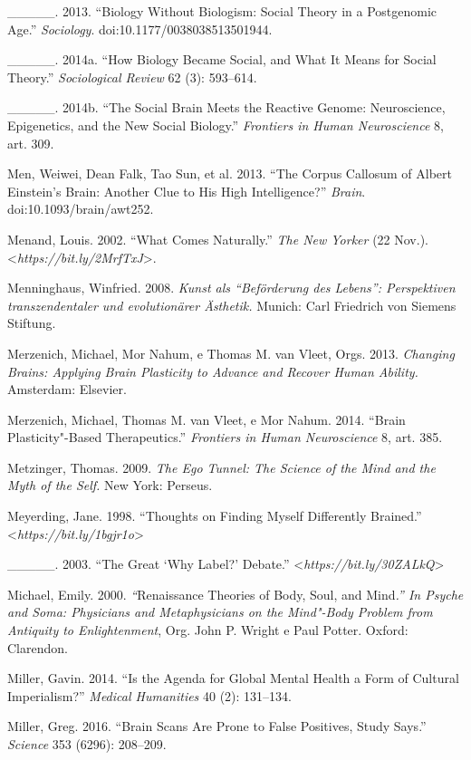 {\begin{Parskip}
\_\_\_\_\_. 2013. ``Biology Without Biologism: Social Theory in a
Postgenomic Age.'' \emph{Sociology}. doi:10.1177/0038038513501944.

\_\_\_\_\_. 2014a. ``How Biology Became Social, and What It Means for
Social Theory.'' \emph{Sociological Review} 62 (3): 593--614.

\_\_\_\_\_. 2014b. ``The Social Brain Meets the Reactive Genome:
Neuroscience, Epigenetics, and the New Social Biology.'' \emph{Frontiers
in Human Neuroscience} 8, art. 309.

Men, Weiwei, Dean Falk, Tao Sun, et al. 2013. ``The Corpus Callosum of
Albert Einstein's Brain: Another Clue to His High Intelligence?''
\emph{Brain}. doi:10.1093/brain/awt252.

Menand, Louis. 2002. ``What Comes Naturally.'' \emph{The New Yorker} (22
Nov.).
\textless{}\emph{https://bit.ly/2MrfTxJ}\textgreater{}.

Menninghaus, Winfried. 2008. \emph{Kunst als ``Beförderung des Lebens'':
Perspektiven transzendentaler und evolutionärer Ästhetik.} Munich: Carl
Friedrich von Siemens Stiftung.

Merzenich, Michael, Mor Nahum, e Thomas M. van Vleet, Orgs. 2013.
\emph{Changing Brains: Applying Brain Plasticity to Advance and Recover
Human Ability.} Amsterdam: Elsevier.

Merzenich, Michael, Thomas M. van Vleet, e Mor Nahum. 2014. ``Brain
Plasticity"-Based Therapeutics.'' \emph{Frontiers in Human Neuroscience}
8, art. 385.

Metzinger, Thomas. 2009. \emph{The Ego Tunnel: The Science of the Mind
and the Myth of the Self.} New York: Perseus.

Meyerding, Jane. 1998. ``Thoughts on Finding Myself Differently
Brained.'' \textless{}\emph{https://bit.ly/1bgjr1o}\textgreater{}

\_\_\_\_\_. 2003. ``The Great `Why Label?' Debate.''
\textless{}\emph{https://bit.ly/30ZALkQ}\textgreater{}

Michael, Emily. 2000. \emph{``}Renaissance Theories of Body, Soul, and
Mind\emph{.'' In Psyche and Soma: Physicians and Metaphysicians on the
Mind"-Body Problem from Antiquity to Enlightenment}, Org. John P. Wright
e Paul Potter. Oxford: Clarendon.

Miller, Gavin. 2014. ``Is the Agenda for Global Mental Health a Form of
Cultural Imperialism?'' \emph{Medical Humanities} 40 (2): 131--134.

Miller, Greg. 2016. ``Brain Scans Are Prone to False Positives, Study
Says.'' \emph{Science} 353 (6296): 208--209.


\end{Parskip}}
